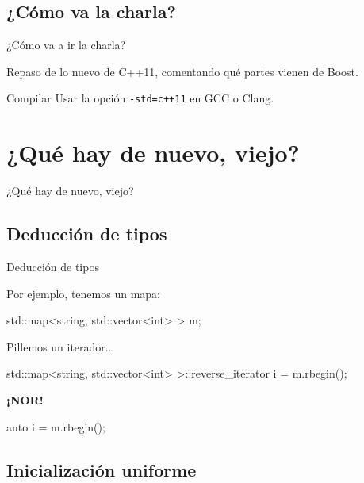 \documentclass[8pt,xcolor=svgnames]{beamer}
\begin{document}
\subsection{¿Cómo va la charla?}

\begin{frame}{¿Cómo va a ir la charla?}
  \centering

  Repaso de lo nuevo de C++11, comentando qué partes vienen de Boost.

\pause

\begin{block}{Compilar}
  Usar la opción \texttt{-std=c++11} en GCC o Clang.
\end{block}
  
\end{frame}

\section{¿Qué hay de nuevo, viejo?}

\begin{frame}
  \Huge 
  \centering

  ¿Qué hay de nuevo, viejo?

\end{frame}

\subsection{Deducción de tipos}

\begin{frame}[fragile]{Deducción de tipos}

Por ejemplo, tenemos un mapa:
\begin{cppcode}
std::map<string, std::vector<int> > m;
\end{cppcode}

\pause

Pillemos un iterador...
\begin{cppcode}
std::map<string, std::vector<int> >::reverse_iterator i = m.rbegin();    
\end{cppcode}

\pause
\textbf{¡NOR!}
\pause

\begin{cppcode}
auto i = m.rbegin();  
\end{cppcode}

\end{frame}

\subsection{Inicialización uniforme}
\end{document}
